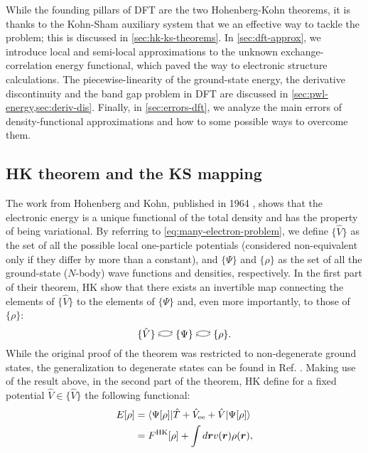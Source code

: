 While the founding pillars of DFT are the two Hohenberg-Kohn theorems, it is thanks to the Kohn-Sham auxiliary system that we an effective way to tackle the problem; this is discussed in \cref{sec:hk-ks-theorems}. In \cref{sec:dft-approx}, we introduce local and semi-local approximations to the unknown exchange-correlation energy functional, which paved the way to electronic structure calculations. The piecewise-linearity of the ground-state energy, the derivative discontinuity and the band gap problem in DFT are discussed in \cref{sec:pwl-energy,sec:deriv-dis}. Finally, in \cref{sec:errors-dft}, we analyze the main errors of density-functional approximations and how to some possible ways to overcome them.

\subsection{HK theorem and the KS mapping\label{sec:hk-ks-theorems}}
The work from Hohenberg and Kohn, published in 1964 \cite{hohenberg_inhomogeneous_1964}, shows that the electronic energy is a unique functional of the total density and has the property of being variational. By referring to \cref{eq:many-electron-problem}, we define $\{ \hat{V} \}$ as the set of all the possible local one-particle potentials (considered non-equivalent only if they differ by more than a constant), and $\{ \Psi \}$ and $\{ \rho \}$ as the set of all the ground-state ($N$-body) wave functions and densities, respectively. In the first part of their theorem, HK show that there exists an invertible map connecting the elements of $\{ \hat{V} \}$ to the elements of $\{ \Psi \}$ and, even more importantly, to those of $\{ \rho \}$:
%
\begin{equation}
    \{ \hat{V} \} \curvedrightleft \{ \Psi \} \curvedrightleft \{ \rho \} .
    \label{eq:hk-theorem}
\end{equation}
%
While the original proof of the theorem was restricted to non-degenerate ground states, the generalization to degenerate states can be found in Ref. \cite{dreizler_density_1990}. Making use of the result above, in the second part of the theorem, HK define for a fixed potential $\hat{V} \in \{ \hat{V} \}$ the following functional:
%
\begin{equation}
\begin{split}
    E[\rho] &= \braket{\Psi[\rho]|\hat{T} + \hat{V}_{\rm ee} + \hat{V}|\Psi[\rho]} \\
    &= F^{\rm HK}[\rho] + \int d{\bm r} v({\bm r}) \rho({\bm r}) ,
\end{split}
\label{eq:hk-functional}
\end{equation}
